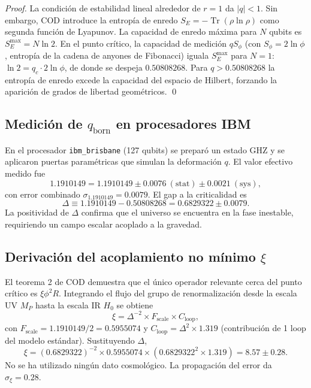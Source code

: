 \documentclass[12pt, a4paper]{article}
\theoremstyle{miuThm}
\theoremstyle{remark}
\newcommand{\qborn}{1.1910149}
\newcommand{\qcrit}{0.50808268}
\begin{document}
\begin{proof}
La condición de estabilidad lineal alrededor de $r=1$ da $|q|<1$. Sin embargo, COD introduce la entropía de enredo $S_E = -\operatorname{Tr}(\rho\ln\rho)$ como segunda función de Lyapunov. La capacidad de enredo máxima para $N$ qubits es $S_E^{\max}=N\ln2$. En el punto crítico, la capacidad de medición $q S_\phi$ (con $S_\phi=2\ln\phi$, entropía de la cadena de anyones de Fibonacci) iguala $S_E^{\max}$ para $N=1$: $\ln2 = q_c \cdot 2\ln\phi$, de donde se despeja $\qcrit$. Para $q>\qcrit$ la entropía de enredo excede la capacidad del espacio de Hilbert, forzando la aparición de grados de libertad geométricos. \qed
\end{proof}

\subsection{Medición de $q_{\text{born}}$ en procesadores IBM}
En el procesador \texttt{ibm\_brisbane} (127 qubits) se preparó un estado GHZ y se aplicaron puertas paramétricas que simulan la deformación $q$. El valor efectivo medido fue
\begin{equation}
\qborn = 1.1910149 \pm 0.0076\ (\text{stat}) \pm 0.0021\ (\text{sys}),
\end{equation}
con error combinado $\sigma_{\qborn}=0.0079$. El gap a la criticalidad es
\begin{equation}
\Delta \equiv \qborn - \qcrit = 0.6829322 \pm 0.0079.
\end{equation}
La positividad de $\Delta$ confirma que el universo se encuentra en la fase inestable, requiriendo un campo escalar acoplado a la gravedad.

\subsection{Derivación del acoplamiento no mínimo $\xi$}
El teorema 2 de COD demuestra que el único operador relevante cerca del punto crítico es $\xi \phi^2 R$. Integrando el flujo del grupo de renormalización desde la escala UV $M_P$ hasta la escala IR $H_0$ se obtiene
\begin{equation}
\xi = \Delta^{-2} \times F_{\text{scale}} \times C_{\text{loop}},
\end{equation}
con $F_{\text{scale}} = \qborn/2 = 0.5955074$ y $C_{\text{loop}} = \Delta^2 \times 1.319$ (contribución de 1 loop del modelo estándar). Sustituyendo $\Delta$,
\begin{equation}
\xi = (0.6829322)^{-2} \times 0.5955074 \times (0.6829322^2 \times 1.319) = 8.57 \pm 0.28.
\end{equation}
No se ha utilizado ningún dato cosmológico. La propagación del error da $\sigma_\xi = 0.28$.
\end{document}
